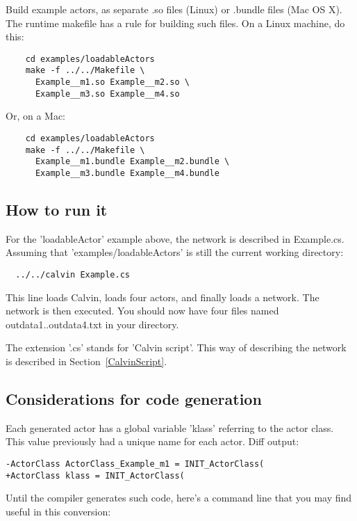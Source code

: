 \documentclass[10pt, a4paper]{article}
\begin{document}
Build example actors, as separate .so files (Linux) or .bundle
   files (Mac OS X). The runtime makefile has a rule for building such
   files. On a Linux machine, do this:

\begin{verbatim}
    cd examples/loadableActors
    make -f ../../Makefile \
      Example__m1.so Example__m2.so \
      Example__m3.so Example__m4.so
\end{verbatim}

   Or, on a Mac:

\begin{verbatim}
    cd examples/loadableActors
    make -f ../../Makefile \
      Example__m1.bundle Example__m2.bundle \
      Example__m3.bundle Example__m4.bundle
\end{verbatim}

\subsection{How to run it}

For the 'loadableActor' example above, the network is described in
Example.cs. Assuming that 'examples/loadableActors' is still the
current working directory:

\begin{verbatim}
  ../../calvin Example.cs
\end{verbatim}

This line loads Calvin, loads four actors, and finally loads a
network. The network is then executed. You should now have four files
named outdata1..outdata4.txt in your directory.

The extension '.cs' stands for 'Calvin script'. This way of describing
the network is described in Section~\ref{CalvinScript}.

\subsection{Considerations for code generation}

Each generated actor has a global variable 'klass' referring to the actor class. This value previously had a unique name for each actor. Diff output:

\begin{verbatim}
-ActorClass ActorClass_Example_m1 = INIT_ActorClass(
+ActorClass klass = INIT_ActorClass(
\end{verbatim}

Until the compiler generates such code, here's a command line that you may find useful in this conversion:
\end{document}
